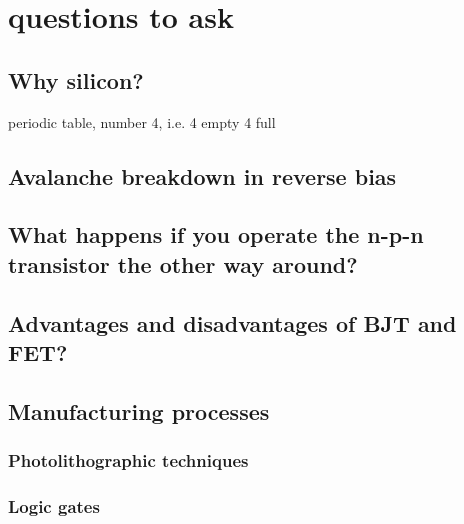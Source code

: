 \documentclass[11pt]{article}
\begin{document}
\section{questions to ask}

\subsection{Why silicon?}
periodic table, number 4, i.e. 4 empty 4 full 
\subsection{Avalanche breakdown in reverse bias}
\subsection{What happens if you operate the n-p-n transistor the other way around?}
\subsection{Advantages and disadvantages of BJT and FET?}
\subsection{Manufacturing processes}
\subsubsection{Photolithographic techniques}
\subsubsection{Logic gates}
\end{document}
